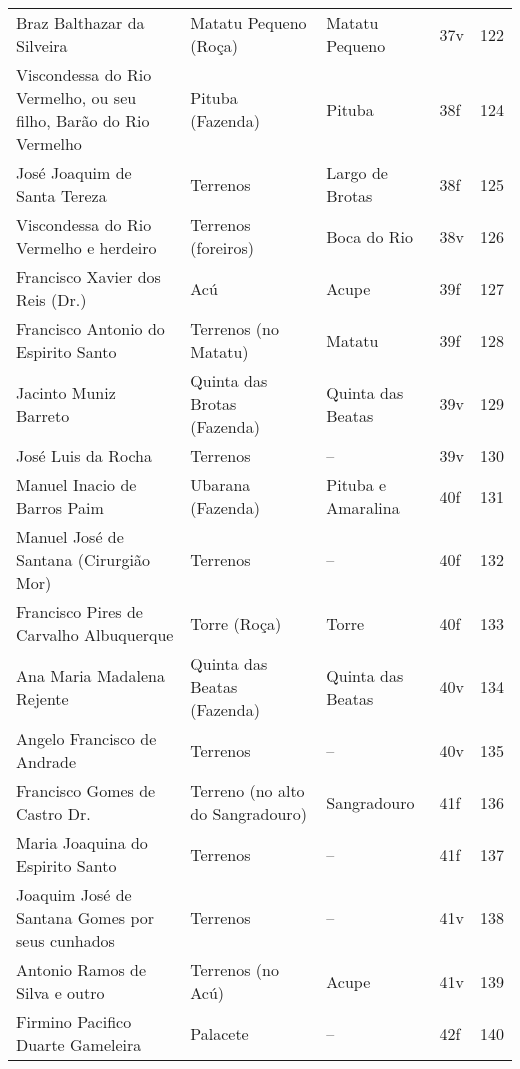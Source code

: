 \begin{table}[ht]
{\begin{minipage}{\textwidth}
\begin{tiny}
\begin{tabular}{p{4cm}p{4cm}p{4cm}ll}
Braz Balthazar da Silveira							&Matatu Pequeno (Roça)			&Matatu Pequeno				&37v			&122			\\
Viscondessa do Rio Vermelho, ou seu filho, Barão do Rio Vermelho		&Pituba (Fazenda)			&Pituba					&38f			&124			\\
José Joaquim de Santa Tereza							&Terrenos				&Largo de Brotas			&38f			&125			\\
Viscondessa do Rio Vermelho e herdeiro						&Terrenos (foreiros)			&Boca do Rio				&38v			&126			\\
Francisco Xavier dos Reis (Dr.)							&Acú					&Acupe					&39f			&127			\\
Francisco Antonio do Espirito Santo						&Terrenos (no Matatu)			&Matatu					&39f			&128			\\
Jacinto Muniz Barreto								&Quinta das Brotas (Fazenda)		&Quinta das Beatas			&39v			&129			\\
José Luis da Rocha								&Terrenos				&--					&39v			&130			\\
Manuel Inacio de Barros Paim							&Ubarana (Fazenda)			&Pituba e Amaralina			&40f			&131			\\
Manuel José de Santana (Cirurgião Mor)						&Terrenos				&--					&40f			&132			\\
Francisco Pires de Carvalho Albuquerque						&Torre (Roça)				&Torre					&40f			&133			\\
Ana Maria Madalena Rejente							&Quinta das Beatas (Fazenda)		&Quinta das Beatas			&40v			&134			\\
Angelo Francisco de Andrade							&Terrenos				&--					&40v			&135			\\
Francisco Gomes de Castro Dr.							&Terreno (no alto do Sangradouro)	&Sangradouro				&41f			&136			\\
Maria Joaquina do Espirito Santo						&Terrenos				&--					&41f			&137			\\
Joaquim José de Santana Gomes por seus cunhados					&Terrenos				&--					&41v			&138			\\
Antonio Ramos de Silva e outro							&Terrenos (no Acú)			&Acupe					&41v			&139			\\
Firmino Pacifico Duarte Gameleira						&Palacete				&--					&42f			&140			\\
\bottomrule
\end{tabular} 
\end{tiny}
\end{minipage}
}
{}
\end{table}
